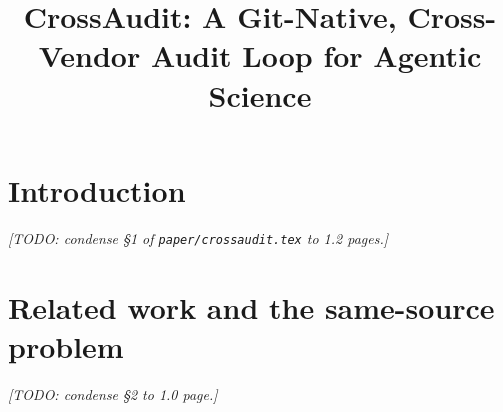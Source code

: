 \documentclass[10pt]{article}
\title{CrossAudit: A Git-Native, Cross-Vendor Audit Loop for Agentic Science}
\date{}
\begin{document}
\maketitle

\begin{abstract}

\end{abstract}


\section{Introduction}\label{sec:intro}
\emph{[TODO: condense \S1 of \texttt{paper/crossaudit.tex} to 1.2 pages.]}

\section{Related work and the same-source problem}\label{sec:related}
\emph{[TODO: condense \S2 to 1.0 page.]}
\end{document}
